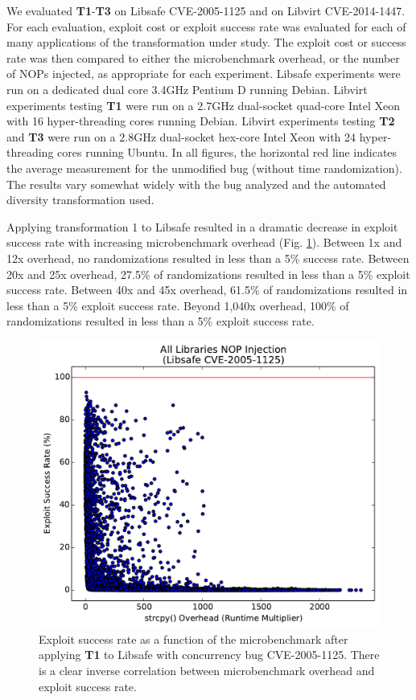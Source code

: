 We evaluated \textbf{T1}-\textbf{T3} on Libsafe CVE-2005-1125 and on Libvirt CVE-2014-1447.
For each evaluation, exploit cost or exploit success rate was evaluated for each of many applications of the transformation under study.
The exploit cost or success rate was then compared to either the microbenchmark overhead, or the number of NOPs injected, as appropriate for each experiment.
Libsafe experiments were run on a dedicated dual core 3.4GHz Pentium D running Debian.
Libvirt experiments testing \textbf{T1} were run on a 2.7GHz dual-socket quad-core Intel Xeon with 16 hyper-threading cores running Debian.
Libvirt experiments testing \textbf{T2} and \textbf{T3} were run on a 2.8GHz dual-socket hex-core Intel Xeon with 24 hyper-threading cores running Ubuntu.
In all figures, the horizontal red line indicates the average measurement for the unmodified bug (without time randomization).
The results vary somewhat widely with the bug analyzed and the automated diversity transformation used.

Applying transformation 1
to Libsafe resulted in a dramatic decrease in exploit success rate with increasing microbenchmark overhead (Fig. \ref{fig_libsafe-all}).
Between 1x and 12x overhead, no randomizations resulted in less than a 5\% success rate.
Between 20x and 25x overhead, 27.5\% of randomizations resulted in less than a 5\% exploit success rate.
Between 40x and 45x overhead, 61.5\% of randomizations resulted in less than a 5\% exploit success rate.
Beyond 1,040x overhead, 100\% of randomizations resulted in less than a 5\% exploit success rate.
\begin{figure}
	\centering
	\includegraphics[width=.75\columnwidth]{figures/libsafe-all}
	\caption{Exploit success rate as a function of the microbenchmark after applying \textbf{T1} to Libsafe with concurrency bug CVE-2005-1125.
	There is a clear inverse correlation between microbenchmark overhead and exploit success rate.}
	\label{fig_libsafe-all}
\end{figure}

